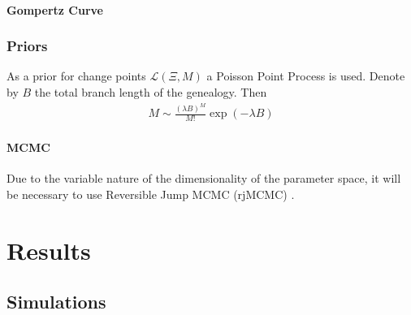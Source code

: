 \documentclass{report}
\theoremstyle{definition}
\begin{document}
\subsubsection{Gompertz Curve}
\subsection{Priors}
As a prior for change points $\mathcal{L}(\Xi,M)$ a Poisson Point Process is used. Denote by $B$ the total branch length of the genealogy. Then
\begin{gather}
M\sim\frac{(\lambda B)^M}{M!}\exp(-\lambda B)
\end{gather}
\subsubsection{MCMC}
Due to the variable nature of the dimensionality of the parameter space, it will be necessary to use Reversible Jump MCMC (rjMCMC) \cite{fan_reversible_2010,green_reversible_1995}.
\chapter{Results}
\section{Simulations}
\end{document}
